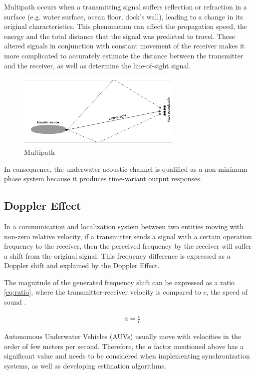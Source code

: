 Multipath occurs when a transmitting signal suffers reflection or refraction in a surface (e.g. water surface, ocean floor, dock's wall), leading to a change in its original characteristics. This phenomenon can affect the propagation speed, the energy and the total distance that the signal was predicted to travel. These altered signals in conjunction with constant movement of the receiver makes it more complicated to accurately estimate the distance between the transmitter and the receiver, as well as determine the line-of-sight signal. 

\begin{figure}[!htbp]
	\centering
	\includegraphics[width=0.7\textwidth]{figures/multipath}
	\caption{Multipath}
	\label{fig:mpath}
\end{figure}

In consequence, the underwater acoustic channel is qualified as a non-minimum phase system because it produces time-variant output responses.

\subsection{Doppler Effect} \label{subsec:doppler}

In a communication and localization system between two entities moving with non-zero relative velocity, if a transmitter sends a signal with a certain operation frequency to the receiver, then the perceived frequency by the receiver will suffer a shift from the original signal. This frequency difference is expressed as a Doppler shift and explained by the Doppler Effect.

The magnitude of the generated frequency shift can be expressed as a ratio \ref{eq:ratio}, where the transmitter-receiver velocity is compared to \(c\), the speed of sound \cite{commchan}.

\begin{eqnarray}
&a = \frac{v}{c}
\label{eq:ratio}
\end{eqnarray}

Autonomous Underwater Vehicles (AUVs) usually move with velocities in the order of few meters per second. Therefore, the \(a\) factor mentioned above has a significant value and needs to be considered when implementing synchronization systems, as well as developing estimation algorithms.

